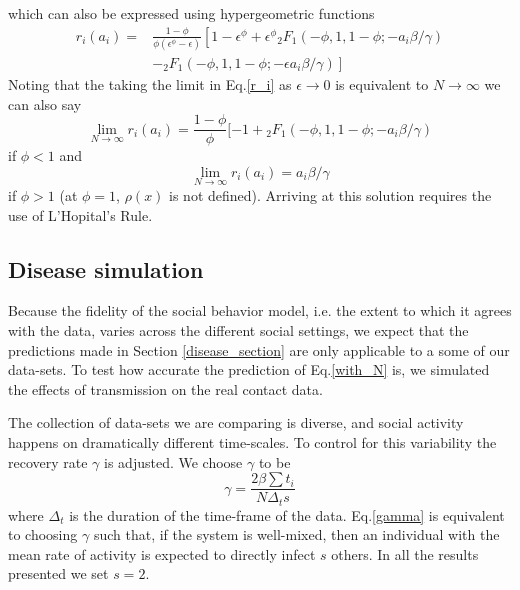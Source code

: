 \documentclass[10pt]{article}
\begin{document}
\begin{multicols}{2}
which can also be expressed using hypergeometric functions
\begin{equation}
\label{with_N}
\begin{split}
r_{i}(a_{i})=&\frac{1-\phi}{\phi(\epsilon^{\phi}-\epsilon)}\left[1-\epsilon^{\phi}+\epsilon^{\phi}{}_{2}F_{1}(-\phi,1,1-\phi;-a_{i}\beta/\gamma)\right.\\
&\left.-{}_{2}F_{1}(-\phi,1,1-\phi;-\epsilon a_{i}\beta/\gamma)\right]
\end{split}
\end{equation}
Noting that the taking the limit in Eq.\eqref{r_i} as $\epsilon\rightarrow 0$ is equivalent to  $N\rightarrow \infty$ we can also say
\begin{equation} 
\label{big_N}
\lim_{N\rightarrow\infty}r_{i}(a_{i}) =\frac{1-\phi}{\phi}[-1+{}_{2}F_{1}(-\phi,1,1-\phi;-a_{i}\beta/\gamma) 
\end{equation}
if $\phi<1$ and 
\begin{equation}
\label{big_N2}
\lim_{N\rightarrow\infty}r_{i}(a_{i}) =a_{i}\beta/\gamma 
\end{equation}
if $\phi>1$ (at $\phi=1$, $\rho(x)$ is not defined). Arriving at this solution requires the use of L'Hopital's Rule.
\subsection{Disease simulation}
Because the fidelity of the social behavior model, i.e. the extent to which it agrees with the data, varies across the different social settings, we expect that the predictions made in Section \ref{disease_section} are only applicable to a some of our data-sets. To test how accurate the prediction of Eq.\eqref{with_N} is, we simulated the effects of transmission on the real contact data.

The collection of data-sets we are comparing is diverse, and social activity happens on dramatically different time-scales. To control for this variability the recovery rate $\gamma$ is adjusted. We choose $\gamma$ to be  
\begin{equation}
\label{gamma}
\gamma=\frac{2\beta\sum t_{i}}{N \Delta_{t} s}
\end{equation}
where $\Delta_{t}$ is the duration of the time-frame of the data. Eq.\eqref{gamma} is equivalent to choosing $\gamma$ such that, if the system is well-mixed, then an individual with the mean rate of activity is expected to directly infect $s$ others. In all the results presented we set $s=2$.


\end{multicols}
\end{document}
